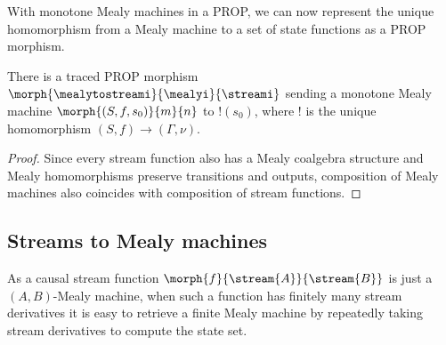 

With monotone Mealy machines in a PROP, we can now represent the unique
homomorphism from a Mealy machine to a set of state functions as a PROP
morphism.

\begin{proposition}\label{prop:mealy-to-stream}
    There is a traced PROP morphism
    \(\morph{\mealytostreami}{\mealyi}{\streami}\) sending a monotone Mealy
    machine \(\morph{\left(S, f, s_0\right)}{m}{n}\) to \(!(s_0)\), where \(!\)
    is the unique homomorphism \((S,f) \to (\Gamma,\nu)\).
\end{proposition}
\begin{proof}
    Since every stream function also has a Mealy coalgebra structure and Mealy
    homomorphisms preserve transitions and outputs,
    composition of Mealy machines also coincides with composition of stream
    functions.
\end{proof}

\subsection{Streams to Mealy machines}

As a causal stream function \(\morph{f}{\stream{A}}{\stream{B}}\) is just a
\((A,B)\)-Mealy machine, when such a function has finitely many stream
derivatives it is easy to retrieve a finite Mealy machine by repeatedly
taking stream derivatives to compute the state set.


